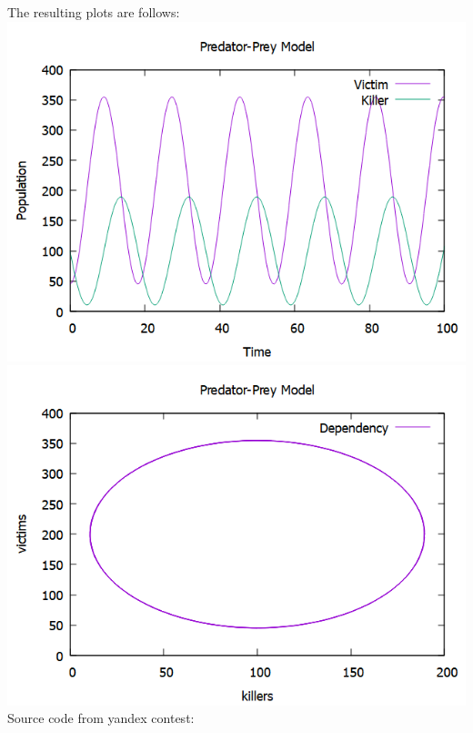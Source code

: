 \documentclass{article}
\begin{document}
The resulting plots are follows: \\ 
\includegraphics[width=1\linewidth]{PredatorPrey1.png} \\
\includegraphics[width=1\linewidth]{PredatorPrey2.png} \\
\newpage
Source code from yandex contest: \\
\end{document}
